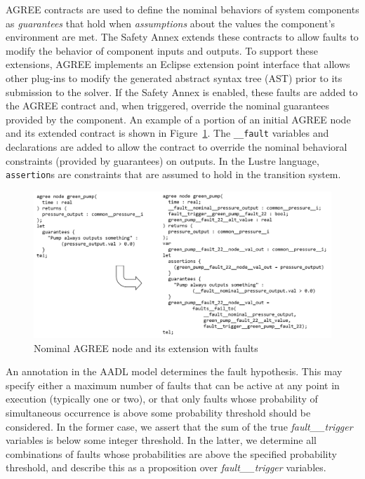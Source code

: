AGREE contracts are used to define the nominal behaviors of system components as {\em guarantees} that hold when {\em assumptions} about the values the component's environment are met.  The Safety Annex extends these contracts to allow faults to modify the behavior of component inputs and outputs.  To support these extensions, AGREE implements an Eclipse extension point interface that allows other plug-ins to modify the generated abstract syntax tree (AST) prior to its submission to the solver.  If the Safety Annex is enabled, these faults are added to the AGREE contract and, when triggered, override the nominal guarantees provided by the component.  An example of a portion of an initial AGREE node and its extended contract is shown in Figure~\ref{fig:comp}.  The \texttt{\_\_fault} variables and declarations are added to allow the contract to override the nominal behavioral constraints (provided by guarantees) on outputs.  In the Lustre language, \texttt{assertion}s are constraints that are assumed to hold in the transition system.

\begin{figure}
	\vspace{-0.1in}
	\includegraphics[width=\textwidth]{images/sample_code.png}
	\vspace{-0.3in}
	\caption{Nominal AGREE node and its extension with faults}
	\label{fig:comp}
\end{figure}

An annotation in the AADL model determines the fault hypothesis.  This may specify either a maximum number of faults that can be active at any point in execution (typically one or two), or that only faults whose probability of simultaneous occurrence is above some probability threshold should be considered.  In the former case, we assert that the sum of the true {\em fault\_\_trigger} variables is below some integer threshold.  In the latter, we determine all  combinations of faults whose probabilities are above the specified probability threshold, and describe this as a proposition over {\em fault\_\_trigger} variables.

